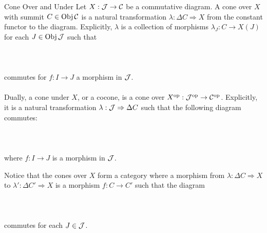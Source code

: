 \documentclass[a4paper]{article}
\begin{document}
\begin{defn}{Cone Over and Under}{} Let $X:\mathcal{J}\to\mathcal{C}$ be a commutative diagram. A cone over $X$ with summit $C\in\operatorname{Obj}\mathcal{C}$ is a natural transformation $\lambda:\Delta C\Rightarrow X$ from the constant functor to the diagram. Explicitly, $\lambda$ is a collection of morphisms $\lambda_J:C\to X(J)$ for each $J\in\operatorname{Obj}\mathcal{J}$ such that \\~\\
\\~\\
commutes for $f:I\to J$ a morphism in $\mathcal{J}$. \\~\\
Dually, a cone under $X$, or a cocone, is a cone over $X^\text{op}:\mathcal{J}^{\text{op}}\to\mathcal{C}^{\text{op}}$. Explicitly, it is a natural transformation $\lambda:\mathcal{J}\Rightarrow\Delta C$ such that the following diagram commutes: \\~\\
\\~\\
where $f:I\to J$ is a morphism in $\mathcal{J}$. 
\end{defn}

Notice that the cones over $X$ form a category where a morphism from $\lambda:\Delta C\Rightarrow X$ to $\lambda':\Delta C'\Rightarrow X$ is a morphism $f:C\to C'$ such that the diagram \\~\\
\\~\\
commutes for each $J\in\mathcal{J}$. 
\end{document}
